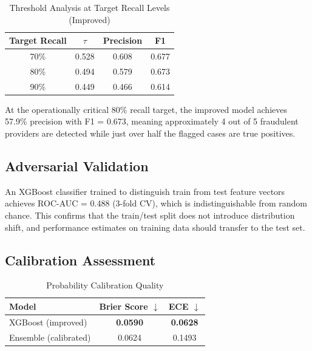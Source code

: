 \documentclass[conference]{IEEEtran}
\begin{document}
\begin{table}[h]
\caption{Threshold Analysis at Target Recall Levels (Improved)}
\label{tab:thresholds}
\centering
\small
\begin{tabular}{@{}cccc@{}}
\toprule
\textbf{Target Recall} & $\tau$ & \textbf{Precision} & \textbf{F1} \\
\midrule
70\% & 0.528 & 0.608 & 0.677 \\
80\% & 0.494 & 0.579 & 0.673 \\
90\% & 0.449 & 0.466 & 0.614 \\
\bottomrule
\end{tabular}
\vspace{-1mm}
\end{table}

At the operationally critical 80\% recall target, the improved model achieves 57.9\% precision with F1 = 0.673, meaning approximately 4 out of 5 fraudulent providers are detected while just over half the flagged cases are true positives.

\subsection{Adversarial Validation}

An XGBoost classifier trained to distinguish train from test feature vectors achieves ROC-AUC = 0.488 (3-fold CV), which is indistinguishable from random chance. This confirms that the train/test split does not introduce distribution shift, and performance estimates on training data should transfer to the test set.

\subsection{Calibration Assessment}

\begin{table}[h]
\caption{Probability Calibration Quality}
\label{tab:calibration}
\centering
\small
\begin{tabular}{@{}lcc@{}}
\toprule
\textbf{Model} & \textbf{Brier Score} $\downarrow$ & \textbf{ECE} $\downarrow$ \\
\midrule
XGBoost (improved) & \textbf{0.0590} & \textbf{0.0628} \\
Ensemble (calibrated) & 0.0624 & 0.1493 \\
\bottomrule
\end{tabular}
\vspace{-1mm}
\end{table}
\end{document}
